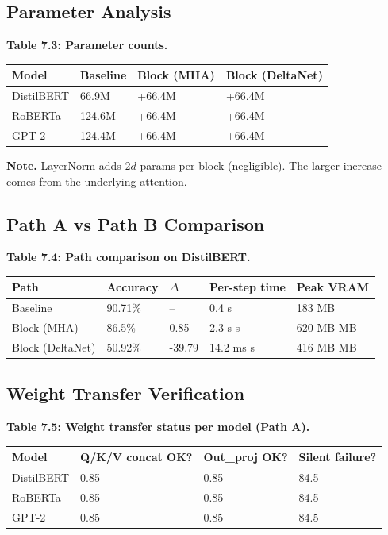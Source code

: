 \subsection{Parameter Analysis}

\textbf{Table 7.3: Parameter counts.}

\begin{table}[H]
\centering
\small
\begin{tabular}{llll}
\toprule
\textbf{Model} & \textbf{Baseline} & \textbf{Block (MHA)} & \textbf{Block (DeltaNet)} \\
\midrule
DistilBERT & 66.9M & +66.4M & +66.4M \\
RoBERTa & 124.6M & +66.4M & +66.4M \\
GPT-2 & 124.4M & +66.4M & +66.4M \\
\bottomrule
\end{tabular}
\end{table}

\textbf{Note.} LayerNorm adds $2d$ params per block (negligible). The larger 
increase comes from the underlying attention.

\subsection{Path A vs Path B Comparison}

\textbf{Table 7.4: Path comparison on DistilBERT.}

\begin{table}[H]
\centering
\small
\begin{tabular}{lllll}
\toprule
\textbf{Path} & \textbf{Accuracy} & \textbf{$\Delta$} & \textbf{Per-step time} & \textbf{Peak VRAM} \\
\midrule
Baseline & 90.71\% & -- & 0.4 s & 183 MB \\
Block (MHA) & 86.5\% & 0.85 & 2.3 s s & 620 MB MB \\
Block (DeltaNet) & 50.92\% & -39.79 & 14.2 ms s & 416 MB MB \\
\bottomrule
\end{tabular}
\end{table}

\subsection{Weight Transfer Verification}

\textbf{Table 7.5: Weight transfer status per model (Path A).}

\begin{table}[H]
\centering
\small
\begin{tabular}{llll}
\toprule
\textbf{Model} & \textbf{Q/K/V concat OK?} & \textbf{Out\_proj OK?} & \textbf{Silent failure?} \\
\midrule
DistilBERT & 0.85 & 0.85 & 84.5 \\
RoBERTa & 0.85 & 0.85 & 84.5 \\
GPT-2 & 0.85 & 0.85 & 84.5 \\
\bottomrule
\end{tabular}
\end{table}

